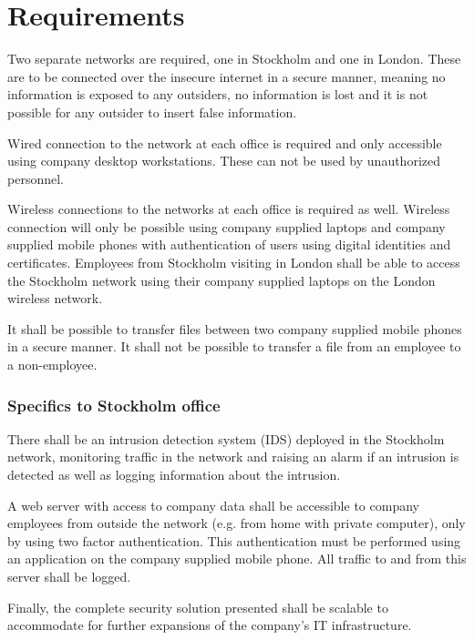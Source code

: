 \section*{Requirements}

Two separate networks are required, one in Stockholm and one in London. These are to be connected over the insecure internet in a secure manner, meaning no information is exposed to any outsiders, no information is lost and it is not possible for any outsider to insert false information.

Wired connection to the network at each office is required and only accessible using company desktop workstations. These can not be used by unauthorized personnel.

Wireless connections to the networks at each office is required as well. Wireless connection will only be possible using company supplied laptops and company supplied mobile phones with authentication of users using digital identities and certificates. Employees from Stockholm visiting in London shall be able to access the Stockholm network using their company supplied laptops on the London wireless network.

It shall be possible to transfer files between two company supplied mobile phones in a secure manner. It shall not be possible to transfer a file from an employee to a non-employee.

\subsubsection*{Specifics to Stockholm office}

There shall be an intrusion detection system (IDS) deployed in the Stockholm network, monitoring traffic in the network and raising an alarm if an intrusion is detected as well as logging information about the intrusion.

A web server with access to company data shall be accessible to company employees from outside the network (e.g. from home with private computer), only by using two factor authentication. This authentication must be performed using an application on the company supplied mobile phone. All traffic to and from this server shall be logged.

Finally, the complete security solution presented shall be scalable to accommodate for further expansions of the company's IT infrastructure.


